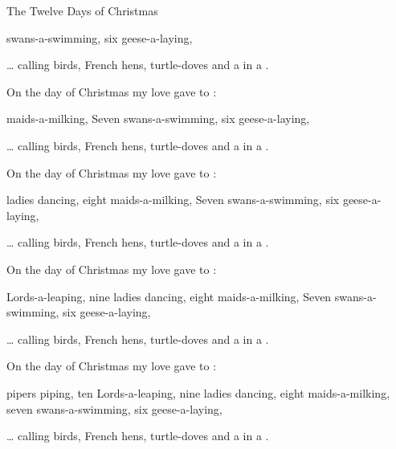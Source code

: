 \begin{SBSong}{The Twelve Days of Christmas}
\begin{SBVerse}
	 swans-a-swimming, 
	six geese-a-laying,
	
	  \ldots 
	 calling birds, 
	 French hens, 
	 turtle-doves 
    and a  in a  .
  \end{SBVerse}
  \begin{SBVerse}
	On the  day of Christmas my  love gave to :

	 maids-a-milking,
	Seven swans-a-swimming, 
	six geese-a-laying,
	
	  \ldots 
	 calling birds, 
	 French hens, 
	 turtle-doves
    and a  in a  .
  \end{SBVerse}
  \begin{SBVerse}
	On the  day of Christmas my  love gave to :

	 ladies dancing, 
	eight maids-a-milking,
	Seven swans-a-swimming, 
	six geese-a-laying,
	
	  \ldots 
	 calling birds, 
	 French hens, 
	 turtle-doves 
    and a  in a  .
  \end{SBVerse}
  \begin{SBVerse}
	On the  day of Christmas my  love gave to :

	 Lords-a-leaping, 
	nine ladies dancing, 
	eight maids-a-milking,
	Seven swans-a-swimming, 
	six geese-a-laying,
	
	  \ldots 
	 calling birds, 
	 French hens, 
	 turtle-doves 
    and a  in a  .
  \end{SBVerse}
  \begin{SBVerse}
	On the  day of Christmas my  love gave to :

	 pipers piping, 
	ten Lords-a-leaping, 
	nine ladies dancing, 
	eight maids-a-milking,
	seven swans-a-swimming, 
	six geese-a-laying,
	
	  \ldots 
	 calling birds, 
	 French hens, 
	 turtle-doves 
    and a  in a  .
  \end{SBVerse}
  

\end{SBSong}
